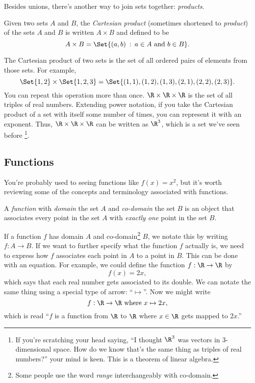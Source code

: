 	Besides unions, there's another way to join sets together:
	\emph{products}.
	\begin{definition}
		Given two sets $A$ and $B$, the \emph{Cartesian product} (sometimes
		shortened to \emph{product}) of the sets $A$ and $B$ is written
		$A\times B$ and defined to be
		\[
			A\times B = \Set{(a,b)\given a\in A\text{ and }b\in B}.
		\]
	\end{definition}
	The Cartesian product of two sets is the set of all ordered pairs of elements from
	those sets.  For example, 
	\[
		\Set{1,2}\times \Set{1,2,3}=\Set{(1,1),(1,2),(1,3),(2,1),(2,2),(2,3)}.
	\]
	You can repeat this operation more than once.   $\R\times \R\times \R$
	is the set of all triples of real numbers.  Extending power
	notation, if you take the Cartesian product of a set
	with itself some number of times, you can represent it with
	an exponent.  Thus, $\R\times \R\times \R$ can be written as $\R^3$, which is a set we've
	seen before%
	\footnote{
		If you're scratching your head saying, ``I thought $\R^3$ was vectors in $3$-dimensional
		space.  How do we know that's the same thing as triples of real numbers?'' your mind
		is keen.  This is a theorem of linear algebra.
	}.

	\subsection{Functions}
	You're probably used to seeing functions like $f(x)=x^2$, but it's worth reviewing some of the concepts
	and terminology associated with functions.

	\begin{definition}[Function]
		A \emph{function} with \emph{domain} the 
		set $A$ and \emph{co-domain} the set $B$ is an object that
		associates every point in the set $A$ with \emph{exactly one} point in the set $B$.
	\end{definition}

	If a function $f$ has domain $A$ and co-domain\footnote{ Some
	people use the word \emph{range} interchangeably with co-domain.} $B$,
	we notate this by writing $f:A\to B$.
	If we want to further specify what the function $f$ actually is, we need to
	express how $f$ associates each point in $A$ to a point in $B$.  This can be done
	with an equation.  For example, we could define the function $f:\R\to\R$ by
	\[
		f(x)=2x,
	\]
	which says that each real number gets associated to its double.  We can notate
	the same thing using a special type of arrow: ``$\mapsto$''.  Now we might write
	\[
		f:\R\to\R\text{ where } x\mapsto 2x,
	\]
	which is read ``$f$ is a function from $\R$ to $\R$ where $x\in \R$ gets mapped to $2x$.''

